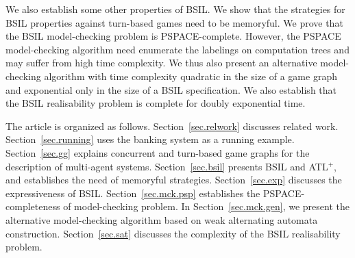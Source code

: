 \documentclass[11pt]{article}
\newcommand{\pfrr}{\Box}
\newcommand{\nxt}{\bigcirc}
\begin{document}
We also establish some other properties of BSIL. 
We show that the strategies  
for BSIL properties against turn-based games need to be memoryful. 
We prove that the BSIL model-checking problem is PSPACE-complete.  
However, the PSPACE model-checking algorithm need enumerate the 
labelings on computation trees and may suffer from high time complexity.  
We thus also present an alternative model-checking algorithm 
with time complexity quadratic in the size of a game graph and 
exponential only in the size of a BSIL specification. 
We also establish that the BSIL realisability problem is complete for
doubly exponential time.  

The article is organized as follows. 
Section~\ref{sec.relwork} discusses related work. 
Section~\ref{sec.running} uses the banking system as a running example. 
Section~\ref{sec.gg} explains concurrent and 
turn-based game graphs for
the description of multi-agent systems.
Section~\ref{sec.bsil} 
presents BSIL and ATL$^+$, and establishes the need of memoryful strategies. 
Section~\ref{sec.exp} discusses the expressiveness of BSIL. 
Section~\ref{sec.mck.psp} establishes\label{reply1.establishes} the PSPACE-completeness 
of model-checking problem.  
In Section~\ref{sec.mck.gen}, we present the alternative 
model-checking algorithm based on weak alternating automata construction.  
Section~\ref{sec.sat} discusses the complexity of 
the BSIL realisability problem.  
\end{document}
